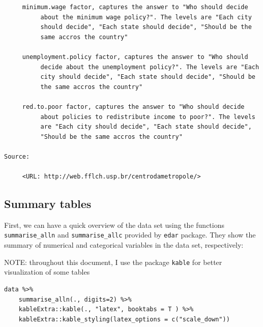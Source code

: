 \documentclass[a4paper]{article}
\begin{document}
\begin{lstlisting}
     minimum.wage factor, captures the answer to "Who should decide
          about the minimum wage policy?". The levels are "Each city
          should decide", "Each state should decide", "Should be the
          same accros the country"

     unemployment.policy factor, captures the answer to "Who should
          decide about the unemployment policy?". The levels are "Each
          city should decide", "Each state should decide", "Should be
          the same accros the country"

     red.to.poor factor, captures the answer to "Who should decide
          about policies to redistribute income to poor?". The levels
          are "Each city should decide", "Each state should decide",
          "Should be the same accros the country"

Source:

     <URL: http://web.fflch.usp.br/centrodametropole/>
\end{lstlisting}


\subsection{Summary tables}
\label{sec:org9b09e67}
First, we can have a quick overview of the data set using the functions \texttt{summarise\_alln} and \texttt{summarise\_allc} provided by \texttt{edar} package. They show the summary of numerical and categorical variables in the data set, respectively:

NOTE: throughout this document, I use the package \texttt{kable} for better visualization of some tables

\lstset{numbers=left,language=r,label= ,caption= ,captionpos=b}
\begin{lstlisting}
data %>% 
    summarise_alln(., digits=2) %>%
    kableExtra::kable(., "latex", booktabs = T ) %>%
    kableExtra::kable_styling(latex_options = c("scale_down"))
\end{lstlisting}
\end{document}

